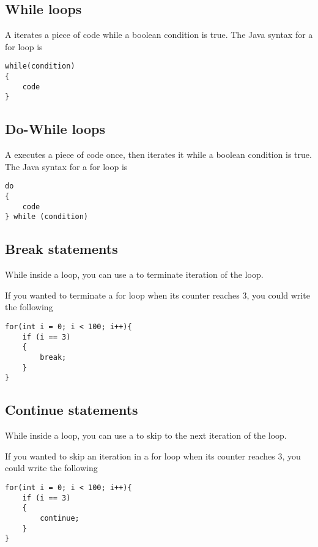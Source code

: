 \documentclass[11pt]{article}
\begin{document}
\subsection{While loops}
A  iterates a piece of code while a boolean condition is true. The Java syntax for a for loop is
\vspace{-20pt}
\begin{lstlisting}[style=basic]
while(condition)
{
    code
}
\end{lstlisting}
\subsection{Do-While loops}
A  executes a piece of code once, then iterates it while a boolean condition is true. The Java syntax for a for loop is
\vspace{-20pt}
\begin{lstlisting}[style=basic]
do
{
    code
} while (condition)
\end{lstlisting}

\subsection{Break statements}
While inside a loop, you can use a  to terminate iteration of the loop.
\begin{eg} If you wanted to terminate a for loop when its counter reaches 3, you could write the following
\vspace{-15pt}
\begin{lstlisting}
for(int i = 0; i < 100; i++){
    if (i == 3)
    {
        break;
    }
}
\end{lstlisting}
\end{eg}

\subsection{Continue statements}
While inside a loop, you can use a  to skip to the next iteration of the loop.
\begin{eg} If you wanted to skip an iteration in a for loop when its counter reaches 3, you could write the following
\vspace{-15pt}
\begin{lstlisting}
for(int i = 0; i < 100; i++){
    if (i == 3)
    {
        continue;
    }
}
\end{lstlisting}
\end{eg}
\pagebreak
\end{document}
